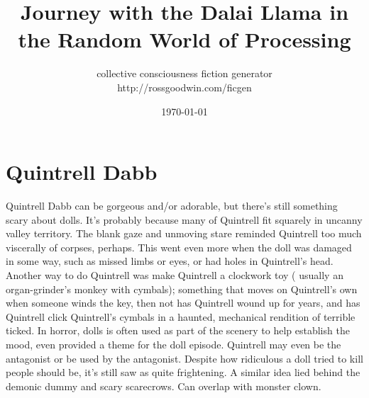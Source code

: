 \documentclass[12pt]{book}
\title{Journey with the Dalai Llama in the Random World of Processing}
\author{collective consciousness fiction generator\\http://rossgoodwin.com/ficgen}
\date{\today}
\begin{document}
\maketitle



\chapter{Quintrell Dabb}

Quintrell Dabb can be gorgeous and/or adorable, but there's still something scary about dolls. It's probably because many of Quintrell fit squarely in uncanny valley territory. The blank gaze and unmoving stare reminded Quintrell too much viscerally of corpses, perhaps. This went even more when the doll was damaged in some way, such as missed limbs or eyes, or had holes in Quintrell's head. Another way to do Quintrell was make Quintrell a clockwork toy ( usually an organ-grinder's monkey with cymbals); something that moves on Quintrell's own when someone winds the key, then not has Quintrell wound up for years, and has Quintrell click Quintrell's cymbals in a haunted, mechanical rendition of terrible ticked. In horror, dolls is often used as part of the scenery to help establish the mood, even provided a theme for the doll episode. Quintrell may even be the antagonist or be used by the antagonist. Despite how ridiculous a doll tried to kill people should be, it's still saw as quite frightening. A similar idea lied behind the demonic dummy and scary scarecrows. Can overlap with monster clown.
\end{document}
